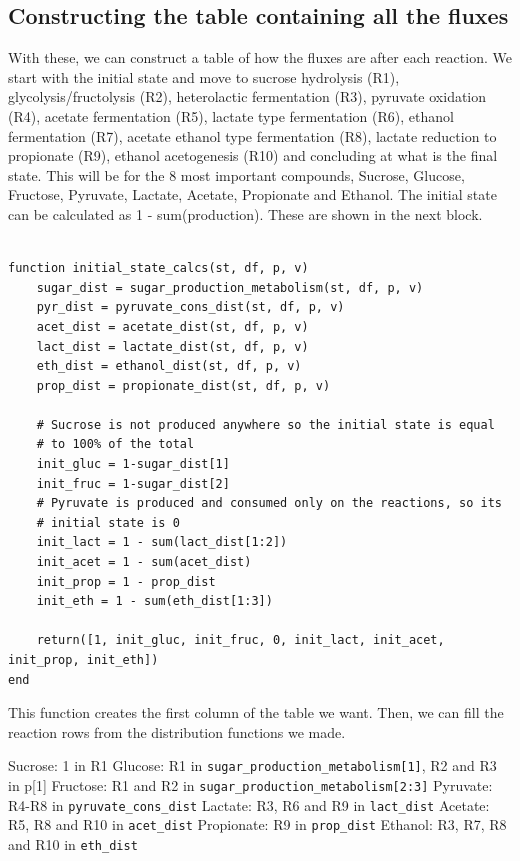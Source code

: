 \documentclass[11pt]{article}
\begin{document}
\subsection{Constructing the table containing all the fluxes}
\label{sec:org53d6e6d}
With these, we can construct a table of how the fluxes are after each reaction. We start with the initial state and move to sucrose hydrolysis (R1), glycolysis/fructolysis (R2), heterolactic fermentation (R3), pyruvate oxidation (R4), acetate fermentation (R5), lactate type fermentation (R6), ethanol fermentation (R7), acetate ethanol type fermentation (R8), lactate reduction to propionate (R9), ethanol acetogenesis (R10) and concluding at what is the final state. This will be for the 8 most important compounds, Sucrose, Glucose, Fructose, Pyruvate, Lactate, Acetate, Propionate and Ethanol. The initial state can be calculated as 1 - sum(production). These are shown in the next block.

\begin{verbatim}

function initial_state_calcs(st, df, p, v)
    sugar_dist = sugar_production_metabolism(st, df, p, v)
    pyr_dist = pyruvate_cons_dist(st, df, p, v)
    acet_dist = acetate_dist(st, df, p, v)
    lact_dist = lactate_dist(st, df, p, v)
    eth_dist = ethanol_dist(st, df, p, v)
    prop_dist = propionate_dist(st, df, p, v)

    # Sucrose is not produced anywhere so the initial state is equal
    # to 100% of the total
    init_gluc = 1-sugar_dist[1]
    init_fruc = 1-sugar_dist[2]
    # Pyruvate is produced and consumed only on the reactions, so its
    # initial state is 0
    init_lact = 1 - sum(lact_dist[1:2])
    init_acet = 1 - sum(acet_dist)
    init_prop = 1 - prop_dist
    init_eth = 1 - sum(eth_dist[1:3])

    return([1, init_gluc, init_fruc, 0, init_lact, init_acet, init_prop, init_eth])
end

\end{verbatim}

This function creates the first column of the table we want. Then, we can fill the reaction rows from the distribution functions we made.

Sucrose: 1 in R1
Glucose: R1 in \texttt{sugar\_production\_metabolism[1]}, R2 and R3 in p[1]
Fructose: R1 and R2 in \texttt{sugar\_production\_metabolism[2:3]}
Pyruvate: R4-R8 in \texttt{pyruvate\_cons\_dist}
Lactate: R3, R6 and R9 in \texttt{lact\_dist}
Acetate: R5, R8 and R10 in \texttt{acet\_dist}
Propionate: R9 in \texttt{prop\_dist}
Ethanol: R3, R7, R8 and R10 in \texttt{eth\_dist}
\end{document}

